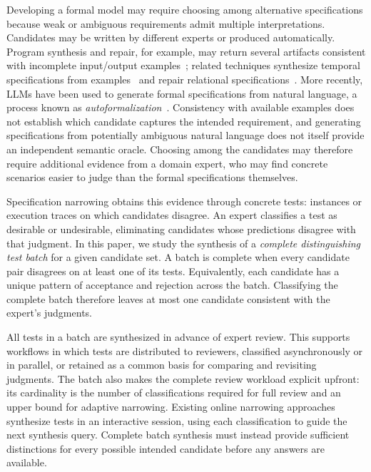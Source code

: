 \documentclass[runningheads]{llncs}
\begin{document}
Developing a formal model may require choosing among alternative
specifications because weak or ambiguous requirements admit multiple
interpretations. Candidates may be written by different experts or produced
automatically. Program synthesis and repair, for example, may return several
artifacts consistent with incomplete input/output
examples~\cite{shriver2017end}; related techniques synthesize temporal
specifications from examples~\cite{gavran2020interactive,zhang2025constrained}
and repair relational
specifications~\cite{wang2019arepair,brida2021beafix,gutierrez2022icebar,cerqueira2022timely}.
More recently, LLMs have been used to generate formal specifications from
natural language, a process known as
\emph{autoformalization}~\cite{weng2025autoformalization,mendoza2026automating}.
Consistency with available examples does not establish which candidate
captures the intended requirement, and generating specifications from
potentially ambiguous natural language does not itself provide an independent
semantic oracle. Choosing among the candidates may therefore require
additional evidence from a domain expert, who may find concrete scenarios
easier to judge than the formal specifications themselves.

Specification narrowing obtains this evidence through concrete tests:
instances or execution traces on which candidates disagree. An expert
classifies a test as desirable or undesirable, eliminating candidates whose
predictions disagree with that judgment. In this paper, we study the synthesis
of a \emph{complete distinguishing test batch} for a given candidate set. A
batch is complete when every candidate pair disagrees on at least one of its
tests. Equivalently, each candidate has a unique pattern of acceptance and
rejection across the batch. Classifying the complete batch therefore leaves
at most one candidate consistent with the expert's judgments.

All tests in a batch are synthesized in advance of expert review. This
supports workflows in which tests are distributed to reviewers, classified
asynchronously or in parallel, or retained as a common basis for comparing
and revisiting judgments. The batch also makes the complete review workload
explicit upfront: its cardinality is the number of classifications required
for full review and an upper bound for adaptive narrowing. Existing online
narrowing approaches~\cite{shriver2017end,gavran2020interactive,mendoza2026automating,prasad2026pick}
synthesize tests in an interactive session, using each classification to guide
the next synthesis query. Complete batch synthesis must instead provide sufficient distinctions
for every possible intended candidate before any answers are available.
\end{document}
